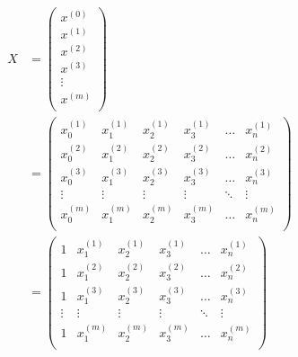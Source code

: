 \begin{equation} \begin{aligned}
	X & = \left(\begin{matrix}
			x^{(0)} \\ x^{(1)} \\ x^{(2)} \\ x^{(3)} \\ \vdots \\ x^{(m)} \\
		\end{matrix}\right) \\
	& = \left( \begin{matrix}
			x_0^{(1)} & x_1^{(1)} & x_2^{(1)} & x_3^{(1)} & \dots & x_n^{(1)} \\
			x_0^{(2)} & x_1^{(2)} & x_2^{(2)} & x_3^{(2)} & \dots & x_n^{(2)} \\
			x_0^{(3)} & x_1^{(3)} & x_2^{(3)} & x_3^{(3)} & \dots & x_n^{(3)} \\
			\vdots    & \vdots    & \vdots    & \vdots    & \ddots & \vdots   \\
			x_0^{(m)} & x_1^{(m)} & x_2^{(m)} & x_3^{(m)} & \dots & x_n^{(m)} \\
			\end{matrix}\right) \\
	& = \left(\begin{matrix}
			1 & x_1^{(1)} & x_2^{(1)} & x_3^{(1)} & \dots & x_n^{(1)} \\
			1 & x_1^{(2)} & x_2^{(2)} & x_3^{(2)} & \dots & x_n^{(2)} \\
			1 & x_1^{(3)} & x_2^{(3)} & x_3^{(3)} & \dots & x_n^{(3)} \\
			\vdots    & \vdots    & \vdots    & \vdots    & \ddots & \vdots   \\
			1 & x_1^{(m)} & x_2^{(m)} & x_3^{(m)} & \dots & x_n^{(m)} \\
		\end{matrix}\right)
\end{aligned} \end{equation}